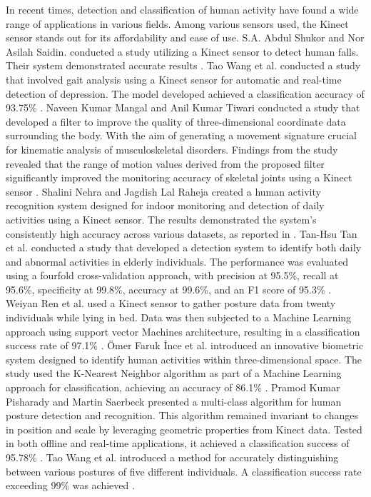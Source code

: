       In recent times, detection and classification of human activity have found a wide range of applications in various fields. Among various sensors used, the Kinect sensor stands out for its affordability and ease of use. S.A. Abdul Shukor and Nor Asilah Saidin. conducted a study utilizing a Kinect sensor to detect human falls. Their system demonstrated accurate results \cite{saidin_analysis_2020}. 
      Tao Wang et al. conducted a study that involved gait analysis using a Kinect sensor for automatic and real-time detection of depression. The model developed achieved a classification accuracy of 93.75\% \cite{wang_gait_2021}.
      Naveen Kumar Mangal and Anil Kumar Tiwari conducted a study that developed a filter to improve the quality of three-dimensional coordinate data surrounding the body. With the aim of generating a movement signature crucial for kinematic analysis of musculoskeletal disorders. Findings from the study revealed that the range of motion values derived from the proposed filter significantly improved the monitoring accuracy of skeletal joints using a Kinect sensor \cite{mangal_kinect_2020}. 
      Shalini Nehra and Jagdish Lal Raheja created a human activity recognition system designed for indoor monitoring and detection of daily activities using a Kinect sensor. The results demonstrated the system's consistently high accuracy across various datasets, as reported in \cite{nehra_unobtrusive_2020}.
      Tan-Hsu Tan et al. conducted a study that developed a detection system to identify both daily and abnormal activities in elderly individuals. The performance was evaluated using a fourfold cross-validation approach, with precision at 95.5\%, recall at 95.6\%, specificity at 99.8\%, accuracy at 99.6\%, and an F1 score of 95.3\% \cite{tan_activity_2020}. 
      Weiyan Ren et al. used a Kinect sensor to gather posture data from twenty individuals while lying in bed. Data was then subjected to a Machine Learning approach using support vector Machines architecture, resulting in a classification success rate of 97.1\% \cite{ren_human_2020}.
      \"{O}mer Faruk \.{I}nce et al. introduced an innovative biometric system designed to identify human activities within three-dimensional space. The study used the K-Nearest Neighbor algorithm as part of a Machine Learning approach for classification, achieving an accuracy of 86.1\% \cite{ince_human_2020}.
      Pramod Kumar Pisharady and Martin Saerbeck presented a multi-class algorithm for human posture detection and recognition. This algorithm remained invariant to changes in position and scale by leveraging geometric properties from Kinect data. Tested in both offline and real-time applications, it achieved a classification success of 95.78\% \cite{pisharady_kinect_2013}.
      Tao Wang et al. introduced a method for accurately distinguishing between various postures of five different individuals. A classification success rate exceeding 99\% was achieved \cite{wang_gait_2021}.


